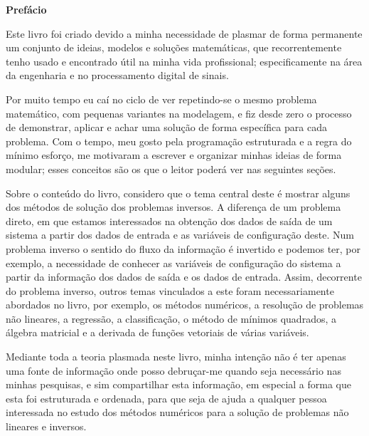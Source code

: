 \cleardoublepage
\newpage
\thispagestyle{empty}

\vfill
\begin{center}
\textbf{\LARGE  Prefácio }
\end{center}

Este livro foi criado devido a minha necessidade de plasmar de forma permanente
um conjunto de ideias, modelos e soluções matemáticas, que recorrentemente
tenho usado e encontrado útil na minha vida profissional;
especificamente na área da engenharia e no processamento digital de sinais.
\begin{comment}
Assim, da mesma forma como se disse que 
``quem não conhece sua história está fadado a repeti-la.'' 
Podemos disser que quem não lembra sua teoria, seus problemas matemáticos ou trabalhos resolvidos, 
estruturando eles modularmente, 
está condenado a ter que 
modelar e demostrar todo varias vesses.
\end{comment}
Por muito tempo eu caí no ciclo de ver repetindo-se o mesmo problema matemático,
com pequenas variantes na modelagem,  
e fiz desde zero o processo de demonstrar, aplicar e achar uma solução de forma específica para cada problema.
Com o tempo, meu gosto pela programação estruturada e a regra do mínimo esforço,
me motivaram a escrever e organizar minhas ideias de forma modular; 
esses conceitos são os que o leitor poderá ver nas seguintes seções.

Sobre o conteúdo do livro, 
considero que o tema central deste é mostrar alguns dos métodos de solução dos problemas inversos.
A diferença de um problema direto, 
em que estamos interessados na obtenção dos dados de saída de um sistema
a partir dos dados de entrada e as variáveis de configuração deste. 
Num problema inverso o sentido do fluxo da informação é invertido e podemos ter, por exemplo,
a necessidade de conhecer as variáveis de configuração do sistema a partir da informação
dos dados de saída e os dados de entrada.
Assim, decorrente do problema inverso, 
outros temas vinculados a este foram necessariamente abordados no livro,
por exemplo, os métodos numéricos, a resolução de problemas não lineares, 
a regressão, a classificação, o método de mínimos quadrados,
a álgebra matricial
e a derivada de funções vetoriais de várias variáveis.

Mediante toda a teoria plasmada neste livro, 
minha intenção não é ter apenas uma fonte de informação onde posso debruçar-me quando seja necessário nas minhas pesquisas,
e sim compartilhar esta informação, em especial a forma que esta foi estruturada e ordenada,
para que seja de ajuda a qualquer pessoa interessada no estudo dos métodos numéricos
para a solução de problemas não lineares e inversos.

\vfill
